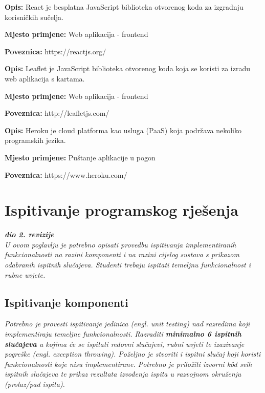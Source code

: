 			\noindent {}
			\begin{packed_item}
				\item  \textbf{Opis:} React je besplatna JavaScript biblioteka otvorenog koda za izgradnju korisničkih sučelja.
				\item  \textbf{Mjesto primjene:} Web aplikacija - frontend
				\item  \textbf{Poveznica:} https://reactjs.org/
			\end{packed_item}
		
			\noindent {}
			\begin{packed_item}
				\item  \textbf{Opis:} Leaflet je JavaScript biblioteka otvorenog koda koja se koristi za izradu web aplikacija s kartama.
				\item  \textbf{Mjesto primjene:} Web aplikacija - frontend
				\item  \textbf{Poveznica:} http://leafletjs.com/
			\end{packed_item}
		
			\noindent {}
			\begin{packed_item}
				\item  \textbf{Opis:} Heroku je cloud platforma kao usluga (PaaS) koja podržava nekoliko programskih jezika.
				\item  \textbf{Mjesto primjene:} Puštanje aplikacije u pogon
				\item  \textbf{Poveznica:} https://www.heroku.com/
			\end{packed_item}
			\eject 
		
	
		\section{Ispitivanje programskog rješenja}
			
			\textbf{\textit{dio 2. revizije}}\\
			
			 \textit{U ovom poglavlju je potrebno opisati provedbu ispitivanja implementiranih funkcionalnosti na razini komponenti i na razini cijelog sustava s prikazom odabranih ispitnih slučajeva. Studenti trebaju ispitati temeljnu funkcionalnost i rubne uvjete.}
	
			
			\subsection{Ispitivanje komponenti}
			\textit{Potrebno je provesti ispitivanje jedinica (engl. unit testing) nad razredima koji implementiraju temeljne funkcionalnosti. Razraditi \textbf{minimalno 6 ispitnih slučajeva} u kojima će se ispitati redovni slučajevi, rubni uvjeti te izazivanje pogreške (engl. exception throwing). Poželjno je stvoriti i ispitni slučaj koji koristi funkcionalnosti koje nisu implementirane. Potrebno je priložiti izvorni kôd svih ispitnih slučajeva te prikaz rezultata izvođenja ispita u razvojnom okruženju (prolaz/pad ispita). }
			

